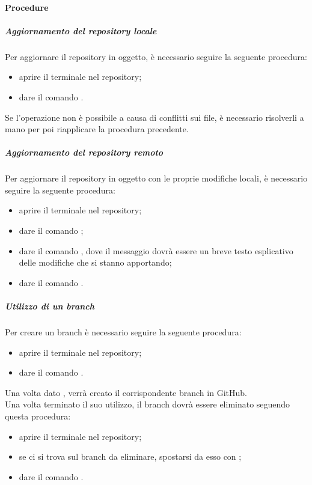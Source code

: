 \paragraph{Procedure}
\subparagraph{Aggiornamento del repository locale}
Per aggiornare il repository in oggetto, è necessario seguire la seguente procedura:
\begin{itemize}
	\item aprire il terminale nel repository;
	\item dare il comando .
\end{itemize}
Se l'operazione non è possibile a causa di conflitti sui file, è necessario risolverli a mano per poi riapplicare la procedura precedente.
\subparagraph{Aggiornamento del repository remoto}
Per aggiornare il repository in oggetto con le proprie modifiche locali, è necessario seguire la seguente procedura:
\begin{itemize}
	\item aprire il terminale nel repository;
	\item dare il comando  ;
	\item dare il comando , dove il messaggio dovrà essere un breve testo esplicativo delle modifiche che si stanno apportando;
	\item dare il comando .
\end{itemize}
\subparagraph{Utilizzo di un branch}
Per creare un branch è necessario seguire la seguente procedura:
\begin{itemize}
	\item aprire il terminale nel repository;
	\item dare il comando .
\end{itemize}
Una volta dato , verrà creato il corrispondente branch in GitHub. \\
Una volta terminato il suo utilizzo, il branch dovrà essere eliminato seguendo questa procedura:
\begin{itemize}
	\item aprire il terminale nel repository;
	\item se ci si trova sul branch da eliminare, spostarsi da esso con ;
	\item dare il comando .
\end{itemize}

